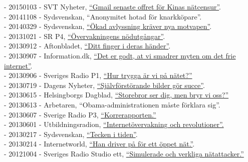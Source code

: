 \documentclass[a4paper,11pt,oneside]{article}
\begin{document}
    - 20150103 - SVT Nyheter, \href{http://www.svt.se/nyheter/utrikes/gmail-senaste-malet-for-kinas-natcensur?cmpid=del:pd:ny:20160803:gmail-senaste-malet-for-kinas-natcensur:nyh}{``Gmail senaste offret för Kinas nätcensur''}. \\
    - 20141108 - Sydsvenskan, ``Anonymitet hotad för knarkköpare''. \\
    - 20140329 - Sydsvenskan, \href{http://www.sydsvenskan.se/2014-03-29/okad-avlyssning-kraver-nya-motvapen}{``Ökad avlyssning kräver nya motvapen''}.\\
    - 20131021 - SR P4, \href{http://t.sr.se/NC8sUF}{``Övervakningens nödutgångar''}. \\
    - 20130912 - Aftonbladet, \href{http://www.aftonbladet.se/nyheter/vetmer/article17455373.ab}{``Ditt finger i deras händer''}. \\
    - 20130907 - Information.dk, \href{http://www.information.dk/471440}{``Det er godt, at vi smadrer myten om det frie internet''}. \\
    - 20130906 - Sveriges Radio P1, \href{http://t.sr.se/OfP0gG}{``Hur trygga är vi på nätet?''} \\
    - 20130719 - Dagens Nyheter, \href{http://www.dn.se/kultur-noje/sjalvforstorande-bilder-gor-succe/}{``Självförstörande bilder gör succe''}. \\
    - 20130615 - Helsingborgs Dagblad, \href{http://www.hd.se/2013-06-15/storebror-ser-dig---men-bryr-vi-oss}{``Storebror ser dig, men bryr vi oss?''} \\
    - 20130613 - Arbetaren, ``Obama-administrationen måste förklara sig''. \\
    - 20130607 - Sverige Radio P3, \href{http://t.sr.se/MiZb35}{``Korrerapporten.''} \\
    - 20130601 - Utbildningsradion, \href{http://urskola.se/Produkter/176858-UR-Samtiden-Overvakning-och-kontroll-Internetovervakning-och-revolutioner}{``Internetövervakning och revolutioner''.} \\
    - 20130217 - Sydsvenskan, \href{http://www.sydsvenskan.se/2013-02-17/tecken-i-tiden}{``Tecken i tiden''}.\\
    - 20130214 - Internetworld, \href{http://www.idg.se/2.1085/1.492033/han-driver-pa-for-ett-oppet-nat}{``Han driver på för ett öppet nät.''}. \\
    - 20121004 - Sveriges Radio Studio ett, \href{http://t.sr.se/1foOdCK}{``Simulerade och verkliga nätattacker.''} \\
\end{document}
